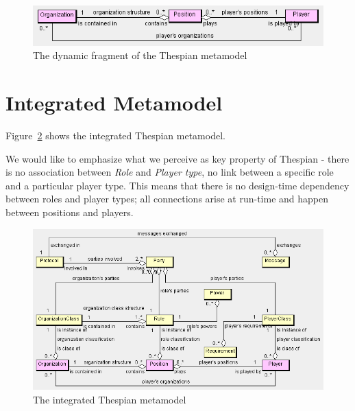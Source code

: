 \begin{figure}[ht]
	\centering
	\includegraphics[width=\textwidth]{images/thespian-dynamic-metamodel.png}
	\caption{The dynamic fragment of the Thespian metamodel}
	\label{figure:thespian-dynamic-metamodel}
\end{figure}

\section{Integrated Metamodel}

Figure~\ref{figure:thespian-integrated-metamodel} shows the integrated Thespian metamodel.

We would like to emphasize what we perceive as key property of Thespian - there is no association between \textit{Role} and \textit{Player type}, no link between a specific role and a particular player type.
This means that there is no design-time dependency between roles and player types; all connections arise at run-time and happen between positions and players.

\begin{figure}[ht]
	\centering
	\includegraphics[width=\textwidth]{images/thespian-integrated-metamodel.png}
	\caption{The integrated Thespian metamodel}
	\label{figure:thespian-integrated-metamodel}
\end{figure}